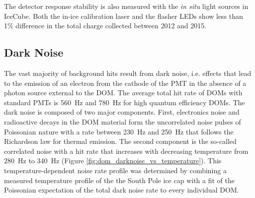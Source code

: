 The detector response stability is also measured with the {\it in
  situ} light sources in IceCube. Both the in-ice calibration laser
\cite{IC3:SC} and the flasher LEDs show less than 1\% difference in the total
charge collected between 2012 and 2015. 

\subsection{\label{sect:darknoise}Dark Noise}

The vast majority of background hits result from dark noise, i.e. effects
that lead to the emission of an electron from the cathode of the PMT in the
absence of a photon source external to the DOM. The average total hit rate of
DOMs with standard PMTs is \SI{560}{\hertz} and \SI{780}{\hertz} for high
quantum efficiency DOMs.  The dark noise is composed of two major 
components.  First, electronics noise and radioactive decays in the DOM material form
the uncorrelated noise pulses of Poissonian nature with a rate between
\SI{230}{\hertz} and \SI{250}{\hertz} that follows the Richardson law for
thermal emission.  The second component is the so-called correlated
noise with a hit rate that increases with decreasing temperature from
\SI{280}{\hertz} to \SI{340}{\hertz} (Figure
\ref{fig:dom_darknoise_vs_temperature}).  This temperature-dependent noise
rate profile was determined by combining a measured temperature profile of
the the South Pole ice cap \cite{price2002temperature} with a fit of the
Poissonian expectation of the total dark noise rate to every individual
DOM.

